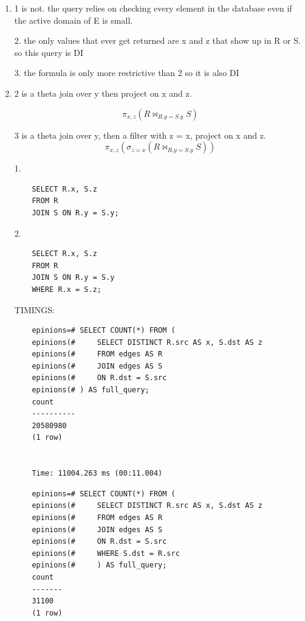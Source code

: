 \documentclass{article}
\begin{document}
\begin{enumerate}
    \item 1 is not. the query relies on checking every element in the database even if the active domain of E is small. 
    
    2. the only values that ever get returned are x and z that show up in R or S. so this query is DI

    3. the formula is only more restrictive than 2 so it is also DI

    \item 2 is a theta join over y then project on x and z. 
    
    \begin{equation}
        \pi_{x,z} ( R \bowtie_{R.y = S.y} S )
    \end{equation}
    
    3 is a theta join over y, then a filter with z = x, project on x and z.
    \begin{equation}
        \pi_{x,z} ( \sigma_{z=x}(R \bowtie_{R.y = S.y} S) )
    \end{equation}

    1. 
    \begin{verbatim}
    SELECT R.x, S.z
    FROM R
    JOIN S ON R.y = S.y;
    \end{verbatim}


    2. 
    \begin{verbatim}
    SELECT R.x, S.z
    FROM R
    JOIN S ON R.y = S.y
    WHERE R.x = S.z;
    \end{verbatim}
    

    TIMINGS:

    \begin{verbatim}
    epinions=# SELECT COUNT(*) FROM (
    epinions(#     SELECT DISTINCT R.src AS x, S.dst AS z
    epinions(#     FROM edges AS R
    epinions(#     JOIN edges AS S
    epinions(#     ON R.dst = S.src
    epinions(# ) AS full_query;
    count
    ----------
    20580980
    (1 row)


    Time: 11004.263 ms (00:11.004)
    \end{verbatim}


    \begin{verbatim}
    epinions=# SELECT COUNT(*) FROM (
    epinions(#     SELECT DISTINCT R.src AS x, S.dst AS z
    epinions(#     FROM edges AS R
    epinions(#     JOIN edges AS S
    epinions(#     ON R.dst = S.src
    epinions(#     WHERE S.dst = R.src
    epinions(#     ) AS full_query;
    count
    -------
    31100
    (1 row)



\end{verbatim}
\end{enumerate}
\end{document}
